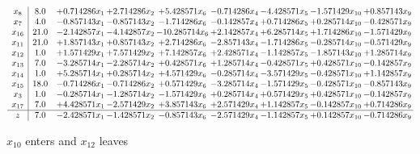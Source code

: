 \documentclass[10pt]{article}
\begin{document}
 \[\begin{array}{c| c c@{\hskip 2pt} c@{\hskip 2pt} c@{\hskip 2pt} c@{\hskip 2pt} c@{\hskip 2pt} c@{\hskip 2pt} c@{\hskip 2pt} }
 x_{8}   &  8.0 & + 0.714286 x_{1} & + 2.714286 x_{2} & + 5.428571 x_{6} & -0.714286 x_{4} & -4.428571 x_{5} & -1.571429 x_{10} & + 0.857143 x_{9}\\
 x_{7}   &  4.0 & -0.857143 x_{1} & -0.857143 x_{2} & -1.714286 x_{6} & -0.142857 x_{4} & + 0.714286 x_{5} & + 0.285714 x_{10} & -0.428571 x_{9}\\
 x_{16}   &  21.0 & -2.142857 x_{1} & -4.142857 x_{2} & -10.285714 x_{6} & + 2.142857 x_{4} & + 6.285714 x_{5} & + 1.714286 x_{10} & -1.571429 x_{9}\\
 x_{11}   &  21.0 & + 1.857143 x_{1} & + 0.857143 x_{2} & + 2.714286 x_{6} & -2.857143 x_{4} & -1.714286 x_{5} & -0.285714 x_{10} & -0.571429 x_{9}\\
 x_{12}   &  1.0 & + 1.571429 x_{1} & + 7.571429 x_{2} & + 7.142857 x_{6} & + 2.428571 x_{4} & -1.142857 x_{5} & -1.857143 x_{10} & + 1.285714 x_{9}\\
 x_{13}   &  7.0 & -3.285714 x_{1} & -2.285714 x_{2} & + 0.428571 x_{6} & + 1.285714 x_{4} & -0.428571 x_{5} & + 0.428571 x_{10} & -0.142857 x_{9}\\
 x_{14}   &  1.0 & + 5.285714 x_{1} & + 0.285714 x_{2} & + 4.571429 x_{6} & -0.285714 x_{4} & -3.571429 x_{5} & -0.428571 x_{10} & + 1.142857 x_{9}\\
 x_{15}   &  18.0 & -0.714286 x_{1} & -0.714286 x_{2} & + 0.571429 x_{6} & -3.285714 x_{4} & -1.571429 x_{5} & -0.428571 x_{10} & -0.857143 x_{9}\\
 x_{3}   &  1.0 & -0.285714 x_{1} & -1.285714 x_{2} & -1.571429 x_{6} & + 0.285714 x_{4} & + 0.571429 x_{5} & + 0.428571 x_{10} & -0.142857 x_{9}\\
 x_{17}   &  7.0 & + 4.428571 x_{1} & -2.571429 x_{2} & + 3.857143 x_{6} & + 2.571429 x_{4} & + 1.142857 x_{5} & -0.142857 x_{10} & + 0.714286 x_{9}\\
\hline
z    &  7.0 & -2.428571 x_{1} & -1.428571 x_{2} & -0.857143 x_{6} & -2.571429 x_{4} & -1.142857 x_{5} & + 0.142857 x_{10} & -0.714286 x_{9}\\
\end{array}\]


 $ x_{10} $ enters and $ x_{12} $ leaves 
\end{document}
